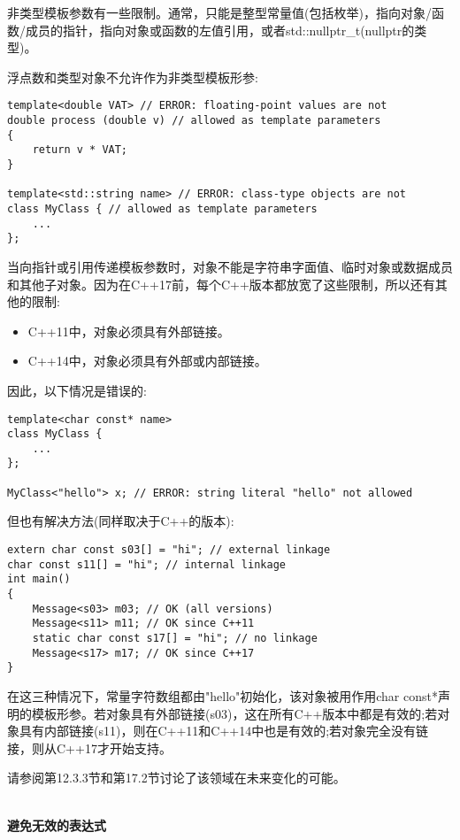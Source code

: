 非类型模板参数有一些限制。通常，只能是整型常量值(包括枚举)，指向对象/函数/成员的指针，指向对象或函数的左值引用，或者std::nullptr\_t(nullptr的类型)。

浮点数和类型对象不允许作为非类型模板形参:

\begin{lstlisting}[style=styleCXX]
template<double VAT> // ERROR: floating-point values are not
double process (double v) // allowed as template parameters
{
	return v * VAT;
}

template<std::string name> // ERROR: class-type objects are not
class MyClass { // allowed as template parameters
	...
};
\end{lstlisting}

当向指针或引用传递模板参数时，对象不能是字符串字面值、临时对象或数据成员和其他子对象。因为在C++17前，每个C++版本都放宽了这些限制，所以还有其他的限制:

\begin{itemize}
\item 
C++11中，对象必须具有外部链接。

\item 
C++14中，对象必须具有外部或内部链接。
\end{itemize}

因此，以下情况是错误的:

\begin{lstlisting}[style=styleCXX]
template<char const* name>
class MyClass {
	...
};

MyClass<"hello"> x; // ERROR: string literal "hello" not allowed
\end{lstlisting}

但也有解决方法(同样取决于C++的版本):

\begin{lstlisting}[style=styleCXX]
extern char const s03[] = "hi"; // external linkage
char const s11[] = "hi"; // internal linkage
int main()
{
	Message<s03> m03; // OK (all versions)
	Message<s11> m11; // OK since C++11
	static char const s17[] = "hi"; // no linkage
	Message<s17> m17; // OK since C++17
}
\end{lstlisting}

在这三种情况下，常量字符数组都由"hello"初始化，该对象被用作用char const*声明的模板形参。若对象具有外部链接(s03)，这在所有C++版本中都是有效的;若对象具有内部链接(s11)，则在C++11和C++14中也是有效的;若对象完全没有链接，则从C++17才开始支持。

请参阅第12.3.3节和第17.2节讨论了该领域在未来变化的可能。

\hspace*{\fill} \\ %
\noindent
\textbf{避免无效的表达式}

